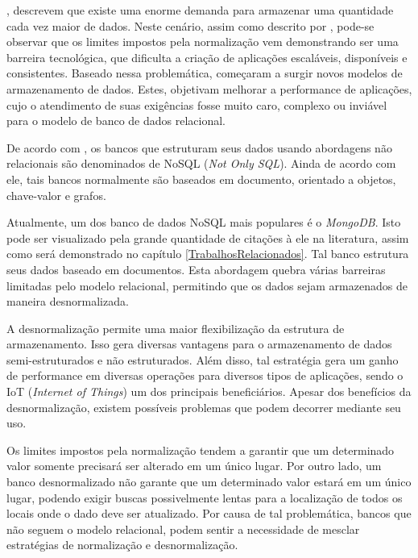 , descrevem que existe uma enorme demanda para armazenar uma quantidade cada vez maior de dados. Neste cenário, assim como descrito por , pode-se observar que os limites impostos pela normalização vem demonstrando ser uma barreira tecnológica, que dificulta a criação de aplicações escaláveis, disponíveis e consistentes. Baseado nessa problemática, começaram a surgir novos modelos de armazenamento de dados. Estes, objetivam melhorar a performance de aplicações, cujo o atendimento de suas exigências fosse muito caro, complexo ou inviável para o modelo de banco de dados relacional.

De acordo com , os bancos que estruturam seus dados usando abordagens não relacionais são denominados de NoSQL (\textit{Not Only SQL}). Ainda de acordo com ele, tais bancos normalmente são baseados em documento, orientado a objetos, chave-valor e grafos.

Atualmente, um dos banco de dados NoSQL mais populares é o \textit{MongoDB}. Isto pode ser visualizado pela grande quantidade de citações à ele na literatura, assim como será demonstrado no capítulo \ref{TrabalhosRelacionados}.
Tal banco estrutura seus dados baseado em documentos. Esta abordagem quebra várias barreiras limitadas pelo modelo relacional, permitindo que os dados sejam armazenados de maneira desnormalizada.

A desnormalização permite uma maior flexibilização da estrutura de armazenamento. Isso gera diversas vantagens para o armazenamento de dados semi-estruturados e não estruturados. Além disso, tal estratégia gera um ganho de performance em diversas operações para diversos tipos de aplicações, sendo o IoT (\textit{Internet of Things}) um dos principais beneficiários. Apesar dos benefícios da desnormalização, existem possíveis problemas que podem decorrer mediante seu uso.

Os limites impostos pela normalização tendem a garantir que um determinado valor somente precisará ser alterado em um único lugar. Por outro lado, um banco desnormalizado não garante que um determinado valor estará em um único lugar, podendo exigir buscas possivelmente lentas para a localização de todos os locais onde o dado deve ser atualizado. Por causa de tal problemática, bancos que não seguem o modelo relacional, podem sentir a necessidade de mesclar estratégias de normalização e desnormalização.

